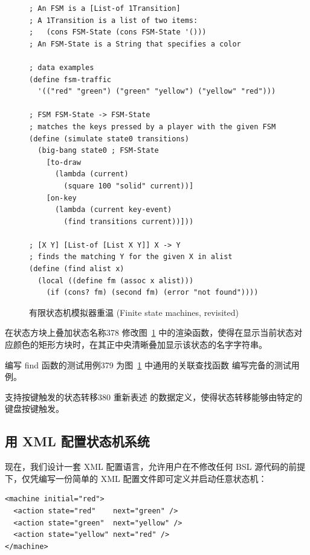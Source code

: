 \begin{figure}[htbp]
  \centering
\begin{lstlisting}[language=BSL, basicstyle=\scriptsize\ttfamily]
; An FSM is a [List-of 1Transition]
; A 1Transition is a list of two items:
;   (cons FSM-State (cons FSM-State '()))
; An FSM-State is a String that specifies a color

; data examples
(define fsm-traffic
  '(("red" "green") ("green" "yellow") ("yellow" "red")))

; FSM FSM-State -> FSM-State
; matches the keys pressed by a player with the given FSM
(define (simulate state0 transitions)
  (big-bang state0 ; FSM-State
    [to-draw
      (lambda (current)
        (square 100 "solid" current))]
    [on-key
      (lambda (current key-event)
        (find transitions current))]))

; [X Y] [List-of [List X Y]] X -> Y
; finds the matching Y for the given X in alist
(define (find alist x)
  (local ((define fm (assoc x alist)))
    (if (cons? fm) (second fm) (error "not found"))))
\end{lstlisting}
  \caption{有限状态机模拟器重温 (Finite state machines, revisited)}
  \label{fig:129}
\end{figure}

\begin{exercise}{在状态方块上叠加状态名称}{378}
修改图~\ref{fig:129} 中的渲染函数，使得在显示当前状态对应颜色的矩形方块时，在其正中央清晰叠加显示该状态的名字字符串。
\end{exercise}

\begin{exercise}{编写 find 函数的测试用例}{379}
为图~\ref{fig:129} 中通用的关联查找函数  编写完备的测试用例。
\end{exercise}

\begin{exercise}{支持按键触发的状态转移}{380}
重新表述  的数据定义，使得状态转移能够由特定的键盘按键触发。
\end{exercise}

\subsection{用 XML 配置状态机系统}

现在，我们设计一套 XML 配置语言，允许用户在不修改任何 BSL 源代码的前提下，仅凭编写一份简单的 XML 配置文件即可定义并启动任意状态机：

\begin{lstlisting}[language=BSL]
<machine initial="red">
  <action state="red"    next="green" />
  <action state="green"  next="yellow" />
  <action state="yellow" next="red" />
</machine>
\end{lstlisting}

